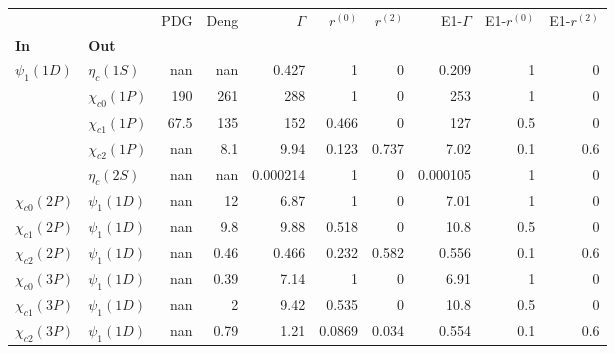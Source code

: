 \begin{tabular}{l|l|r|r|r|r|r|r|r|r}
\toprule
                &                &  PDG &  Deng &  $\Gamma$ &  $r^{(0)}$ &  $r^{(2)}$ &  E1-$\Gamma$ &  E1-$r^{(0)}$ &  E1-$r^{(2)}$ \\
\textbf{In} & \textbf{Out} &      &       &           &            &            &              &               &               \\
\midrule
\textbf{$\psi_{1}(1D)$} & \textbf{$\eta_{c}(1S)$} &  nan &   nan &     0.427 &          1 &          0 &        0.209 &             1 &             0 \\
                & \textbf{$\chi_{c0}(1P)$} &  190 &   261 &       288 &          1 &          0 &          253 &             1 &             0 \\
                & \textbf{$\chi_{c1}(1P)$} & 67.5 &   135 &       152 &      0.466 &          0 &          127 &           0.5 &             0 \\
                & \textbf{$\chi_{c2}(1P)$} &  nan &   8.1 &      9.94 &      0.123 &      0.737 &         7.02 &           0.1 &           0.6 \\
                & \textbf{$\eta_{c}(2S)$} &  nan &   nan &  0.000214 &          1 &          0 &     0.000105 &             1 &             0 \\
\textbf{$\chi_{c0}(2P)$} & \textbf{$\psi_{1}(1D)$} &  nan &    12 &      6.87 &          1 &          0 &         7.01 &             1 &             0 \\
\textbf{$\chi_{c1}(2P)$} & \textbf{$\psi_{1}(1D)$} &  nan &   9.8 &      9.88 &      0.518 &          0 &         10.8 &           0.5 &             0 \\
\textbf{$\chi_{c2}(2P)$} & \textbf{$\psi_{1}(1D)$} &  nan &  0.46 &     0.466 &      0.232 &      0.582 &        0.556 &           0.1 &           0.6 \\
\textbf{$\chi_{c0}(3P)$} & \textbf{$\psi_{1}(1D)$} &  nan &  0.39 &      7.14 &          1 &          0 &         6.91 &             1 &             0 \\
\textbf{$\chi_{c1}(3P)$} & \textbf{$\psi_{1}(1D)$} &  nan &     2 &      9.42 &      0.535 &          0 &         10.8 &           0.5 &             0 \\
\textbf{$\chi_{c2}(3P)$} & \textbf{$\psi_{1}(1D)$} &  nan &  0.79 &      1.21 &     0.0869 &      0.034 &        0.554 &           0.1 &           0.6 \\
\bottomrule
\end{tabular}
